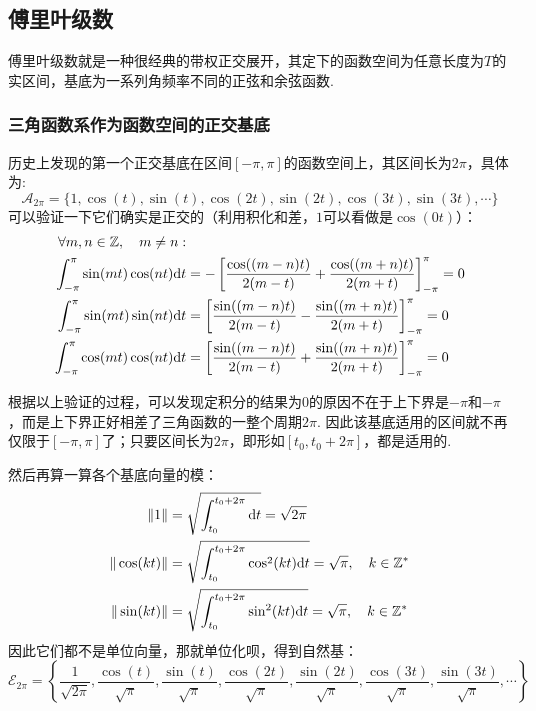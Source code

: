 \documentclass[UTF8]{ctexart}
\newcommand{\trm}[1]{{\rm #1}}
\begin{document}
\subsection{傅里叶级数}

傅里叶级数就是一种很经典的带权正交展开，其定下的函数空间为任意长度为\(T\)的实区间，基底为一系列角频率不同的正弦和余弦函数.

\subsubsection{三角函数系作为函数空间的正交基底}

历史上发现的第一个正交基底在区间\([-\pi,\pi]\)的函数空间上，其区间长为\(2\pi\)，具体为:
\[ \mathcal{A}_{2\pi} = \{ 1, \cos(t), \sin(t), \cos(2t), \sin(2t), \cos(3t), \sin(3t), \cdots \} \]
可以验证一下它们确实是正交的（利用积化和差，\(1\)可以看做是\(\cos(0t)\)）：
\begin{align*}
    \forall m,n\in \mathbb{Z},\quad m \neq n: & \\
    \int_{-\pi}^{\pi} \sin(mt)\cos(nt) \trm{d}t &= -\left[\frac{\cos((m-n)t)}{2(m-t)}+\frac{\cos((m+n)t)}{2(m+t)}\right]_{-\pi}^{\pi} = 0 \\
    \int_{-\pi}^{\pi} \sin(mt)\sin(nt) \trm{d}t &= \left[\frac{\sin((m-n)t)}{2(m-t)}-\frac{\sin((m+n)t)}{2(m+t)}\right]_{-\pi}^{\pi} = 0 \\
    \int_{-\pi}^{\pi} \cos(mt)\cos(nt) \trm{d}t &= \left[\frac{\sin((m-n)t)}{2(m-t)}+\frac{\sin((m+n)t)}{2(m+t)}\right]_{-\pi}^{\pi} = 0
\end{align*}

根据以上验证的过程，可以发现定积分的结果为\(0\)的原因不在于上下界是\(-\pi\)和\(-\pi\)，而是上下界正好相差了三角函数的一整个周期\(2\pi\). 因此该基底适用的区间就不再仅限于\([-\pi,\pi]\)了；只要区间长为\(2\pi\)，即形如\([t_0,t_0+2\pi]\)，都是适用的.

然后再算一算各个基底向量的模：
\begin{align*}
    \|1\| &= \sqrt{\int_{t_0}^{t_0+2\pi} \trm{d}t} = \sqrt{2\pi} \\
    \|\cos(kt)\| &= \sqrt{\int_{t_0}^{t_0+2\pi} \cos^2(kt) \trm{d}t} = \sqrt{\pi},\quad k \in \mathbb{Z}^* \\
    \|\sin(kt)\| &= \sqrt{\int_{t_0}^{t_0+2\pi} \sin^2(kt) \trm{d}t} = \sqrt{\pi},\quad k \in \mathbb{Z}^*
\end{align*}
因此它们都不是单位向量，那就单位化呗，得到自然基：
\[ \mathcal{E}_{2\pi} = \left\{ \frac{1}{\sqrt{2\pi}}, \frac{\cos(t)}{\sqrt{\pi}}, \frac{\sin(t)}{\sqrt{\pi}}, \frac{\cos(2t)}{\sqrt{\pi}}, \frac{\sin(2t)}{\sqrt{\pi}}, \frac{\cos(3t)}{\sqrt{\pi}}, \frac{\sin(3t)}{\sqrt{\pi}}, \cdots \right\} \]
\end{document}

